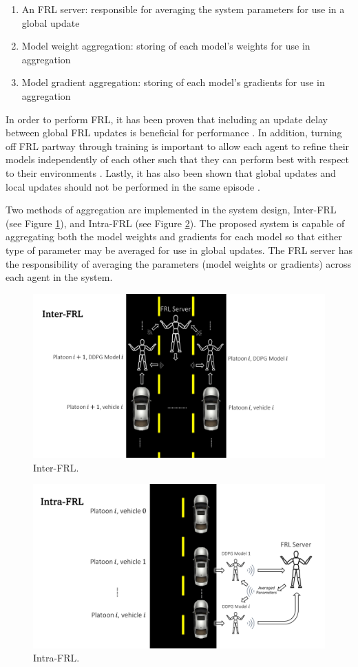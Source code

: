 \begin{enumerate}
    \item An FRL server: responsible for averaging the system parameters for use in a 
    global update
    \item Model weight aggregation: storing of each model's weights for use in 
    aggregation
    \item Model gradient aggregation: storing of each model's gradients for use in
     aggregation
\end{enumerate}

In order to perform FRL, it has been proven that including an update delay between global 
FRL updates is beneficial for performance \cite{Lim2020}. In addition, turning off FRL 
partway through training is important to allow each agent to refine their models 
independently of each other such that they can perform best with respect to their 
environments \cite{Lim2020}.  Lastly, it has also been shown that global updates and 
local updates should not be performed in the same episode \cite{Liang2019}.  

Two methods of aggregation are implemented in the system design, Inter-FRL 
(see Figure \ref{fig:interfrl}), and Intra-FRL (see Figure \ref{fig:intrafrl}).  
The proposed system is capable of aggregating both the model weights and gradients 
for each model so that either type of parameter may be averaged for use in global updates.  
The FRL server has the responsibility of averaging the parameters 
(model weights or gradients) across each agent in the system. 

\begin{figure}[H]
    \centering
    \includegraphics[width=0.69\linewidth]{assets/interfrl.PNG}
    \caption{Inter-FRL.}
    \label{fig:interfrl}
\end{figure}
\begin{figure}[H]
    \centering
    \includegraphics[width=0.69\linewidth]{assets/intrafrl.PNG}
    \caption{Intra-FRL.}
    \label{fig:intrafrl}
\end{figure}


